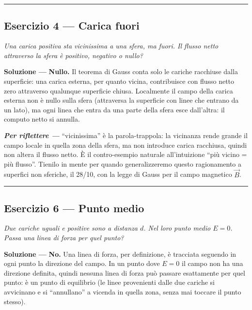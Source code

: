 \documentclass[11pt,a4paper]{scrartcl}
\newenvironment{soluzione}{\par\noindent\textbf{Soluzione ---} }{\par}
\newenvironment{riflessione}{\par\noindent\textit{\textbf{Per riflettere ---} }}{\par}
\begin{document}
\bigskip\hrule\bigskip

\subsection*{Esercizio 4 --- Carica fuori}

\begin{esercizio}
\emph{Una carica positiva sta vicinissima a una sfera, ma fuori. Il flusso netto attraverso
la sfera è positivo, negativo o nullo?}
\end{esercizio}

\begin{soluzione}
\textbf{Nullo.} Il teorema di Gauss conta solo le cariche racchiuse dalla superficie: una carica
esterna, per quanto vicina, contribuisce con flusso netto zero attraverso qualunque superficie
chiusa. Localmente il campo della carica esterna non è nullo sulla sfera (attraversa la superficie
con linee che entrano da un lato), ma ogni linea che entra da una parte della sfera esce dall'altra:
il computo netto si annulla.
\end{soluzione}

\begin{riflessione}
``vicinissima'' è la parola-trappola: la vicinanza rende grande il campo locale in quella zona della
sfera, ma non introduce carica racchiusa, quindi non altera il flusso netto. È il contro-esempio
naturale all'intuizione ``più vicino = più flusso''. Tienilo in mente per quando generalizzeremo
questo ragionamento a superfici non sferiche, il 28/10, con la legge di Gauss per il campo
magnetico $\vec B$.
\end{riflessione}

\bigskip\hrule\bigskip

\subsection*{Esercizio 6 --- Punto medio}

\begin{esercizio}
\emph{Due cariche uguali e positive sono a distanza $d$. Nel loro punto medio $E=0$. Passa
una linea di forza per quel punto?}
\end{esercizio}

\begin{soluzione}
\textbf{No.} Una linea di forza, per definizione, è tracciata seguendo in ogni punto la direzione
del campo. In un punto dove $E=0$ il campo non ha una direzione definita, quindi nessuna linea di
forza può passare esattamente per quel punto: è un punto di equilibrio (le linee provenienti dalle
due cariche si avvicinano e si ``annullano'' a vicenda in quella zona, senza mai toccare il punto
stesso).
\end{soluzione}
\end{document}
